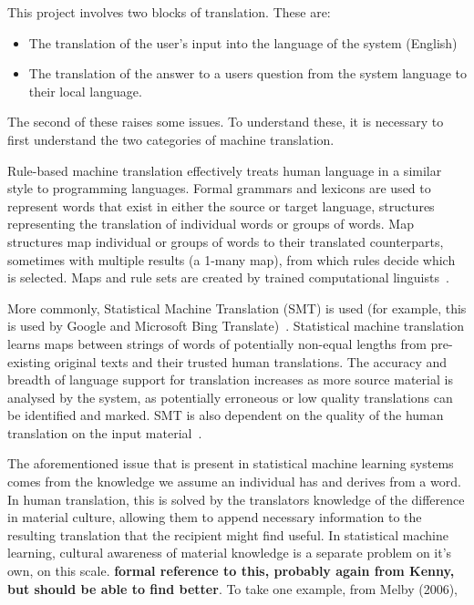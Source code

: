 \documentclass{article}
\begin{document}
This project involves two blocks of translation.  These are:
\begin{itemize}
  \item The translation of the user's input into the language of the system (English)
  \item The translation of the answer to a users question from the system language to their local language.
\end{itemize}
The second of these raises some issues.  To understand these, it is necessary to first understand the two categories of machine translation.

Rule-based machine translation effectively treats human language in a similar style to programming languages.  Formal grammars and lexicons are used to represent words that exist in either the source or target language, structures representing the translation of individual words or groups of words.  Map structures map individual or groups of words to their translated counterparts, sometimes with multiple results (a 1-many map), from which rules decide which is selected.  Maps and rule sets are created by trained computational linguists~\cite{kenny2011ethics}.

More commonly, Statistical Machine Translation (SMT) is used (for example, this is used by Google and Microsoft Bing Translate)~\cite{kenny2011ethics, Google_Translate_Research}.  Statistical machine translation learns maps between strings of words of potentially non-equal lengths from pre-existing original texts and their trusted human translations.  The accuracy and breadth of language support for translation increases as more source material is analysed by the system, as potentially erroneous or low quality translations can be identified and marked.  SMT is also dependent on the quality of the human translation on the input material~\cite{kenny2011ethics}.

The aforementioned issue that is present in statistical machine learning systems comes from the knowledge we assume an individual has and derives from a word.  In human translation, this is solved by the translators knowledge of the difference in material culture, allowing them to append necessary information to the resulting translation that the recipient might find useful.  In statistical machine learning, cultural awareness of material knowledge is a separate problem on it's own, on this scale.  {\bf formal reference to this, probably again from Kenny, but should be able to find better}.  To take one example, from Melby (2006),
\end{document}
